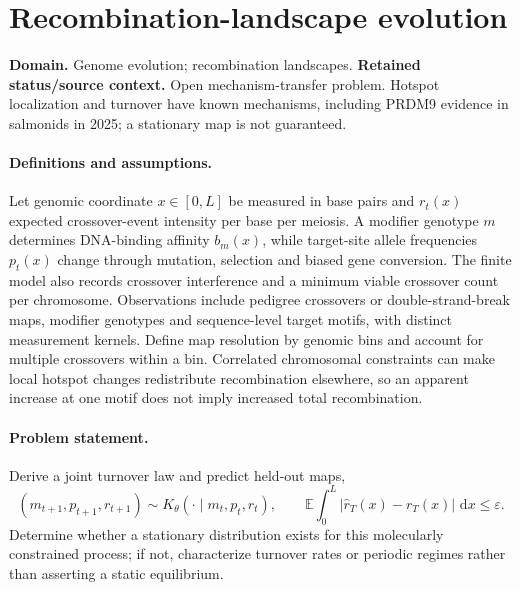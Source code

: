 \documentclass[11pt]{article}
\begin{document}
\section*{Recombination-landscape evolution}
\label{prob:170}
\label{rank:160}
\par\smallskip

\noindent\textbf{Domain.} Genome evolution; recombination landscapes. \quad \textbf{Retained status/source context.} Open mechanism-transfer problem. Hotspot localization and turnover have known mechanisms, including PRDM9 evidence in salmonids in 2025; a stationary map is not guaranteed.
\paragraph{Definitions and assumptions.} Let genomic coordinate $x\in[0,L]$ be measured in base pairs and $r_t(x)$ expected crossover-event intensity per base per meiosis. A modifier genotype $m$ determines DNA-binding affinity $b_m(x)$, while target-site allele frequencies $p_t(x)$ change through mutation, selection and biased gene conversion. The finite model also records crossover interference and a minimum viable crossover count per chromosome. Observations include pedigree crossovers or double-strand-break maps, modifier genotypes and sequence-level target motifs, with distinct measurement kernels. Define map resolution by genomic bins and account for multiple crossovers within a bin. Correlated chromosomal constraints can make local hotspot changes redistribute recombination elsewhere, so an apparent increase at one motif does not imply increased total recombination.
\paragraph{Problem statement.} Derive a joint turnover law and predict held-out maps,
\[
 (m_{t+1},p_{t+1},r_{t+1})\sim
 K_\theta(\cdot\mid m_t,p_t,r_t),\qquad
 \mathbb{E}\!\int_0^L|\widehat r_T(x)-r_T(x)|\,\,\mathrm{d} x\le\varepsilon.
\]
Determine whether a stationary distribution exists for this molecularly constrained process; if not, characterize turnover rates or periodic regimes rather than asserting a static equilibrium.
\end{document}
